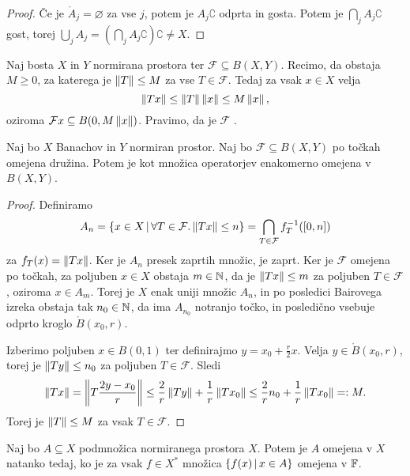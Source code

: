 \begin{proof}
  Če je $\mathring{A}_j = \varnothing$ za vse $j$, potem je $A_j\complement$
  odprta in gosta.
  Potem je $\bigcap_j A_j\complement$ gost, torej $\bigcup_j A_j = \left(
	\bigcap_j A_j\complement \right)\complement \ne X$.
\end{proof}


Naj bosta $X$ in $Y$ normirana prostora ter $\mathcal{F} \subseteq B(X,Y)$.
Recimo, da obstaja $M \ge 0$, za katerega je $\left\lVert T\right\rVert \le M$ za vse $T \in
\mathcal{F}$.
Tedaj za vsak $x \in X$ velja
\[
  \left\lVert Tx\right\rVert \le \left\lVert T\right\rVert \left\lVert x\right\rVert \le M \left\lVert x\right\rVert,
\]
oziroma $\mathcal{F}x \subseteq B(0, M \left\lVert x\right\rVert)$.
Pravimo, da je $\mathcal{F}$ .

\begin{izrek}
  Naj bo $X$ Banachov in $Y$ normiran prostor.
  Naj bo $\mathcal{F} \subseteq B(X,Y)$ po točkah omejena družina.
  Potem je kot množica operatorjev enakomerno omejena v $B(X,Y)$.
\end{izrek}

\begin{proof}
  Definiramo
  \[
	A_n = \{ x \in X \,|\, \forall T \in \mathcal{F} . \left\lVert Tx\right\rVert \le n \}
	= \bigcap_{T \in \mathcal{F}} f_T^{-1}([0,n])
  \]
  za $f_T(x) = \left\lVert Tx\right\rVert$.
  Ker je $A_n$ presek zaprtih množic, je zaprt.
  Ker je $\mathcal{F}$ omejena po točkah, za poljuben $x \in X$ obstaja $m \in
  \mathbb{N}$, da je $\left\lVert Tx\right\rVert \le m$ za poljuben $T \in \mathcal{F}$, oziroma $x \in
  A_m$.
  Torej je $X$ enak uniji množic $A_n$, in po posledici Bairovega izreka obstaja
  tak $n_0 \in \mathbb{N}$, da ima $A_{n_0}$ notranjo točko, in posledično vsebuje
  odprto kroglo $\mathring{B}(x_0, r)$.

  Izberimo poljuben $x \in B(0,1)$ ter definirajmo $y = x_0 + \frac{r}{2} x$.
  Velja $y \in \mathring{B}(x_0, r)$, torej je $\left\lVert Ty\right\rVert \le n_0$ za poljuben
  $T \in \mathcal{F}$.
  Sledi
  \[
	\left\lVert Tx\right\rVert = \left\lVert T \frac{2y - x_0}{r}\right\rVert
	\le \frac{2}{r} \left\lVert Ty\right\rVert + \frac{1}{r} \left\lVert T x_0\right\rVert
	\le \frac{2}{r} n_0 + \frac{1}{r} \left\lVert T x_0\right\rVert
	=: M.
  \]
  Torej je $\left\lVert T\right\rVert \le M$ za vsak $T \in \mathcal{F}$.
\end{proof}


\begin{izrek}
  Naj bo $A \subseteq X$ podmnožica normiranega prostora $X$.
  Potem je $A$ omejena v $X$ natanko tedaj, ko je za vsak $f \in X^*$ množica
  $\{f(x) \,|\, x \in A\}$ omejena v $\mathbb{F}$.
\end{izrek}

